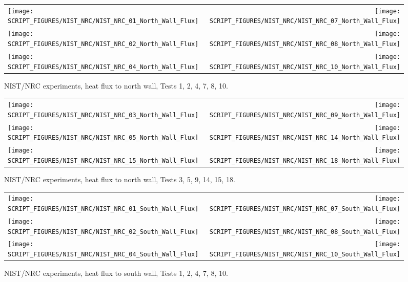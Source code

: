 \begin{figure}[p]
\begin{tabular*}{\textwidth}{l@{\extracolsep{\fill}}r}
\texttt{[image: SCRIPT\_FIGURES/NIST\_NRC/NIST\_NRC\_01\_North\_Wall\_Flux]} &
\texttt{[image: SCRIPT\_FIGURES/NIST\_NRC/NIST\_NRC\_07\_North\_Wall\_Flux]} \\
\texttt{[image: SCRIPT\_FIGURES/NIST\_NRC/NIST\_NRC\_02\_North\_Wall\_Flux]} &
\texttt{[image: SCRIPT\_FIGURES/NIST\_NRC/NIST\_NRC\_08\_North\_Wall\_Flux]} \\
\texttt{[image: SCRIPT\_FIGURES/NIST\_NRC/NIST\_NRC\_04\_North\_Wall\_Flux]} &
\texttt{[image: SCRIPT\_FIGURES/NIST\_NRC/NIST\_NRC\_10\_North\_Wall\_Flux]}
\end{tabular*}
\caption[NIST/NRC experiments, heat flux to north wall, Tests 1, 2, 4, 7, 8, 10]{NIST/NRC experiments, heat flux to north wall, Tests 1, 2, 4, 7, 8, 10.}
\label{NIST_NRC_North_Wall_Flux_Closed}
\end{figure}

\begin{figure}[p]
\begin{tabular*}{\textwidth}{l@{\extracolsep{\fill}}r}
\texttt{[image: SCRIPT\_FIGURES/NIST\_NRC/NIST\_NRC\_03\_North\_Wall\_Flux]} &
\texttt{[image: SCRIPT\_FIGURES/NIST\_NRC/NIST\_NRC\_09\_North\_Wall\_Flux]} \\
\texttt{[image: SCRIPT\_FIGURES/NIST\_NRC/NIST\_NRC\_05\_North\_Wall\_Flux]} &
\texttt{[image: SCRIPT\_FIGURES/NIST\_NRC/NIST\_NRC\_14\_North\_Wall\_Flux]} \\
\texttt{[image: SCRIPT\_FIGURES/NIST\_NRC/NIST\_NRC\_15\_North\_Wall\_Flux]} &
\texttt{[image: SCRIPT\_FIGURES/NIST\_NRC/NIST\_NRC\_18\_North\_Wall\_Flux]}
\end{tabular*}
\caption[NIST/NRC experiments, heat flux to north wall, Tests 3, 5, 9, 14, 15, 18]{NIST/NRC experiments, heat flux to north wall, Tests 3, 5, 9, 14, 15, 18.}
\label{NIST_NRC_North_Wall_Flux_Open}
\end{figure}

\begin{figure}[p]
\begin{tabular*}{\textwidth}{l@{\extracolsep{\fill}}r}
\texttt{[image: SCRIPT\_FIGURES/NIST\_NRC/NIST\_NRC\_01\_South\_Wall\_Flux]} &
\texttt{[image: SCRIPT\_FIGURES/NIST\_NRC/NIST\_NRC\_07\_South\_Wall\_Flux]} \\
\texttt{[image: SCRIPT\_FIGURES/NIST\_NRC/NIST\_NRC\_02\_South\_Wall\_Flux]} &
\texttt{[image: SCRIPT\_FIGURES/NIST\_NRC/NIST\_NRC\_08\_South\_Wall\_Flux]} \\
\texttt{[image: SCRIPT\_FIGURES/NIST\_NRC/NIST\_NRC\_04\_South\_Wall\_Flux]} &
\texttt{[image: SCRIPT\_FIGURES/NIST\_NRC/NIST\_NRC\_10\_South\_Wall\_Flux]}
\end{tabular*}
\caption[NIST/NRC experiments, heat flux to south wall, Tests 1, 2, 4, 7, 8, 10]{NIST/NRC experiments, heat flux to south wall, Tests 1, 2, 4, 7, 8, 10.}
\label{NIST_NRC_South_Wall_Flux_Closed}
\end{figure}

